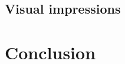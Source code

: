 \documentclass[a4paper]{article}
\begin{document}
\subsection{Visual impressions}





\section{Conclusion}




\end{document}
